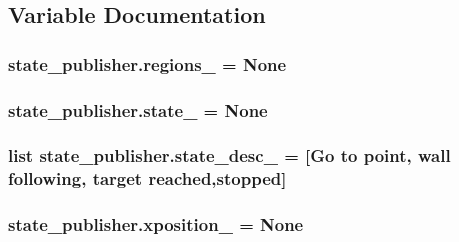 \subsection{Variable Documentation}
\subsubsection[{\texorpdfstring{regions\+\_\+}{regions_}}]{\setlength{\rightskip}{0pt plus 5cm}state\+\_\+publisher.\+regions\+\_\+ = None}\hypertarget{namespacestate__publisher_ab7132fcdb3b135c9865d93ca8a41b889}{}\label{namespacestate__publisher_ab7132fcdb3b135c9865d93ca8a41b889}
\subsubsection[{\texorpdfstring{state\+\_\+}{state_}}]{\setlength{\rightskip}{0pt plus 5cm}state\+\_\+publisher.\+state\+\_\+ = None}\hypertarget{namespacestate__publisher_a43f0bf52594d3691f18d8d9181e36b1b}{}\label{namespacestate__publisher_a43f0bf52594d3691f18d8d9181e36b1b}
\subsubsection[{\texorpdfstring{state\+\_\+desc\+\_\+}{state_desc_}}]{\setlength{\rightskip}{0pt plus 5cm}list state\+\_\+publisher.\+state\+\_\+desc\+\_\+ = \mbox{[}\textquotesingle{}Go to point\textquotesingle{}, \textquotesingle{}wall following\textquotesingle{}, \textquotesingle{}target reached\textquotesingle{},\textquotesingle{}stopped\textquotesingle{}\mbox{]}}\hypertarget{namespacestate__publisher_aa8361482ad30732347576ea45828316e}{}\label{namespacestate__publisher_aa8361482ad30732347576ea45828316e}
\subsubsection[{\texorpdfstring{xposition\+\_\+}{xposition_}}]{\setlength{\rightskip}{0pt plus 5cm}state\+\_\+publisher.\+xposition\+\_\+ = None}\hypertarget{namespacestate__publisher_a5cd2539591061514c0d16846bc660a62}{}\label{namespacestate__publisher_a5cd2539591061514c0d16846bc660a62}
